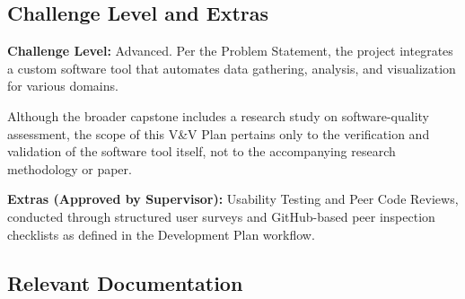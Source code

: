 \documentclass[12pt, titlepage]{article}
\begin{document}
\subsection{Challenge Level and Extras}
\label{subsec:challenge-level}

\textbf{Challenge Level:} Advanced. Per the Problem Statement, the project
integrates a custom software tool that automates data gathering, analysis, and
visualization for various domains.

Although the broader capstone includes a research study on software-quality
assessment, the scope of this V\&V Plan pertains only to the verification and
validation of the software tool itself, not to the accompanying research
methodology or paper.


\textbf{Extras (Approved by Supervisor):} Usability Testing and Peer Code
Reviews, conducted through structured user surveys and GitHub-based peer
inspection checklists as defined in the Development Plan workflow.

\subsection{Relevant Documentation}
\label{subsec:relevant-docs}
\end{document}
